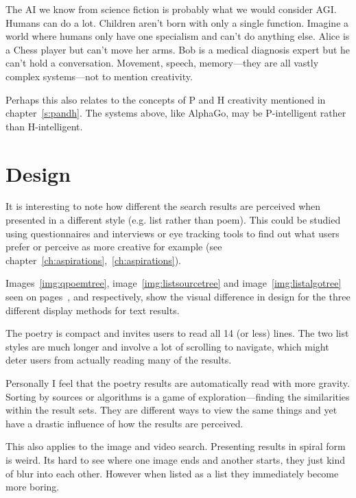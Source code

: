The \ac{AI} we know from science fiction is probably what we would consider \ac{AGI}. Humans can do a lot. Children aren't born with only a single function. Imagine a world where humans only have one specialism and can't do anything else. Alice is a Chess player but can't move her arms. Bob is a medical diagnosis expert but he can't hold a conversation. Movement, speech, memory---they are all vastly complex systems---not to mention creativity.

Perhaps this also relates to the concepts of P and H creativity mentioned in chapter~\ref{s:pandh}. The systems above, like AlphaGo, may be P-intelligent rather than H-intelligent.


\section{Design}

It is interesting to note how different the search results are perceived when presented in a different style (e.g. list rather than poem). This could be studied using questionnaires and interviews or eye tracking tools to find out what users prefer or perceive as more creative for example (see chapter~\ref{ch:aspirations},~\ref{ch:aspirations}). 

Images~\ref{img:qpoemtree}, image~\ref{img:listsourcetree} and image~\ref{img:listalgotree} seen on pages~\pageref{img:qpoemtree},\pageref{img:listsourcetree} and \pageref{img:qpoemtree} respectively, show the visual difference in design for the three different display methods for text results.

The poetry is compact and invites users to read all \num{14} (or less) lines. The two list styles are much longer and involve a lot of scrolling to navigate, which might deter users from actually reading many of the results.

Personally I feel that the poetry results are automatically read with more gravity. Sorting by sources or algorithms is a game of exploration---finding the similarities within the result sets. They are different ways to view the same things and yet have a drastic influence of how the results are perceived. 

This also applies to the image and video search. Presenting results in spiral form is weird. Its hard to see where one image ends and another starts, they just kind of blur into each other. However when listed as a list they immediately become more boring.


